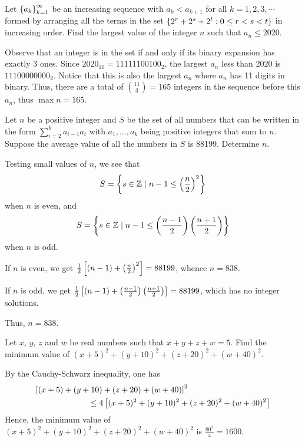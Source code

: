 \begin{question}[165]\label{Q::2020-O-1-22}
    Let $\left\lbrace a_k \right\rbrace_{k=1}^\infty$ be an increasing sequence with $a_k < a_{k+1}$ for all $k = 1, 2, 3, \cdots$ formed by arranging all the terms in the set $\left\lbrace 2^r + 2^s + 2^t : 0 \leq r < s < t \right\rbrace$ in increasing order. Find the largest value of the integer $n$ such that $a_n \leq 2020$.
\end{question}
\begin{solution*}
    Observe that an integer is in the set if and only if its binary expansion has exactly 3 ones. Since $2020_{10} = 11111100100_{2}$, the largest $a_n$ less than 2020 is $11100000000_{2}$. Notice that this is also the largest $a_n$ where $a_n$ has 11 digits in binary. Thus, there are a total of $\binom{11}{3} = 165$ integers in the sequence before this $a_n$, thus $\max n = 165$.
\end{solution*}

\clearpage
\begin{question}[838]\label{Q::2020-O-1-23}
    Let $n$ be a positive integer and $S$ be the set of all numbers that can be written in the form $\displaystyle\sum_{i = 2}^k a_{i-1}a_i$ with $a_1, \ldots, a_k$ being positive integers that sum to $n$. Suppose the average value of all the numbers in $S$ is 88199. Determine $n$.
\end{question}
\begin{solution*}
    Testing small values of $n$, we see that \[S = \left\lbrace s \in \mathbb{Z} \mid n-1 \leq \left( \frac{n}{2} \right)^2 \right\rbrace\] when $n$ is even, and \[S = \left\lbrace s \in \mathbb{Z} \mid n-1 \leq \left( \frac{n-1}{2} \right)\left( \frac{n+1}{2} \right) \right\rbrace\] when $n$ is odd.

     If $n$ is even, we get $\frac12 \left[ (n-1) + \left( \frac{n}{2} \right)^2 \right] = 88199$, whence $n = 838$.
    
     If $n$ is odd, we get $\frac12 \left[ (n-1) + \left( \frac{n-1}{2} \right)\left( \frac{n+1}{2} \right) \right] = 88199$, which has no integer solutions.
    
    Thus, $n = 838$.
\end{solution*}

\begin{question}[1600]\label{Q::2020-O-1-24}
    Let $x$, $y$, $z$ and $w$ be real numbers such that $x + y + z + w = 5$. Find the minimum value of $(x + 5)^2 + (y + 10)^2 + (z + 20)^2 + (w + 40)^2$.
\end{question}
\begin{solution*}
    By the Cauchy-Schwarz inequality, one has
    \begin{align*}
        \bs{(x+5)+(y+10)+(z+20)+(w+40)}^2 \hspace{10em}\\
        \hspace{3em}\leq 4 \bs{(x + 5)^2 + (y + 10)^2 + (z + 20)^2 + (w + 40)^2}
    \end{align*}
    Hence, the minimum value of $(x + 5)^2 + (y + 10)^2 + (z + 20)^2 + (w + 40)^2$ is $\frac{80^2}4 = 1600$.
\end{solution*}

